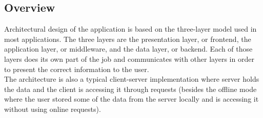 \subsection{Overview}
\hspace{\parindent}Architectural design of the application is based on the three-layer model used in most applications. The three layers are the presentation layer, or frontend, the application layer, or middleware, and the data layer, or backend. Each of those layers does its own part of the job and communicates with other layers in order to present the correct information to the user.\\
The architecture is also a typical client-server implementation where server holds the data and the client is accessing it through requests (besides the offline mode where the user stored some of the data from the server locally and is accessing it without using online requests).\\
\newpage
